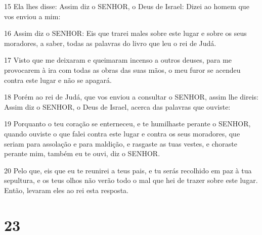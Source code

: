 \par 15 Ela lhes disse: Assim diz o SENHOR, o Deus de Israel: Dizei ao homem que vos enviou a mim:
\par 16 Assim diz o SENHOR: Eis que trarei males sobre este lugar e sobre os seus moradores, a saber, todas as palavras do livro que leu o rei de Judá.
\par 17 Visto que me deixaram e queimaram incenso a outros deuses, para me provocarem à ira com todas as obras das suas mãos, o meu furor se acendeu contra este lugar e não se apagará.
\par 18 Porém ao rei de Judá, que vos enviou a consultar o SENHOR, assim lhe direis: Assim diz o SENHOR, o Deus de Israel, acerca das palavras que ouviste:
\par 19 Porquanto o teu coração se enterneceu, e te humilhaste perante o SENHOR, quando ouviste o que falei contra este lugar e contra os seus moradores, que seriam para assolação e para maldição, e rasgaste as tuas vestes, e choraste perante mim, também eu te ouvi, diz o SENHOR.
\par 20 Pelo que, eis que eu te reunirei a teus pais, e tu serás recolhido em paz à tua sepultura, e os teus olhos não verão todo o mal que hei de trazer sobre este lugar. Então, levaram eles ao rei esta resposta.

\chapter{23}

